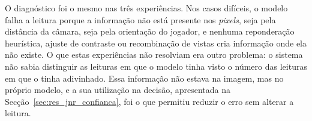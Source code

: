 O diagnóstico foi o mesmo nas três experiências. Nos casos difíceis, o modelo falha a leitura
porque a informação não está presente nos \emph{pixels}, seja pela distância da câmara, seja pela
orientação do jogador, e nenhuma reponderação heurística, ajuste de contraste ou recombinação de
vistas cria informação onde ela não existe. O que estas experiências não resolviam era outro
problema: o sistema não sabia distinguir as leituras em que o modelo tinha visto o número das
leituras em que o tinha adivinhado. Essa informação não estava na imagem, mas no próprio modelo,
e a sua utilização na decisão, apresentada na Secção~\ref{sec:res_jnr_confianca}, foi o que
permitiu reduzir o erro sem alterar a leitura.


